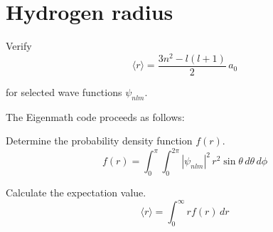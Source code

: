 

\section*{Hydrogen radius}

Verify
\begin{equation*}
\langle r\rangle=\frac{3n^2-l(l+1)}{2}\,a_0
\end{equation*}

for selected wave functions $\psi_{nlm}$.

\bigskip
The Eigenmath code proceeds as follows:

\bigskip
Determine the probability density function $f(r)$.
\begin{equation*}
f(r)=\int_0^\pi\int_0^{2\pi}|\psi_{nlm}|^2\,r^2\sin\theta\,d\theta\,d\phi
\end{equation*}

Calculate the expectation value.
\begin{equation*}
\langle r\rangle=\int_0^\infty rf(r)\,dr
\end{equation*}


